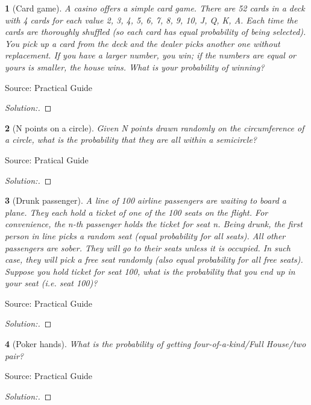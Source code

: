 \documentclass[10pt]{report}
\newtheorem{exe}{}[chapter]
\newenvironment{sol}{\begin{proof}[Solution:]}{\end{proof}}
\begin{document}
\begin{exe}[Card game]
A casino offers a simple card game. There are 52 cards in a deck with 4 cards for each
value 2, 3, 4, 5, 6, 7, 8, 9, 10, J, Q, K, A. Each time the cards are thoroughly shuffled
(so each card has equal probability of being selected). You pick up a card from the deck
and the dealer picks another one without replacement. If you have a larger number, you
win; if the numbers are equal or yours is smaller, the house wins. What is your probability of winning? 
\end{exe}
\begin{teacher}
Source: Practical Guide
\begin{sol}
\end{sol}
\end{teacher}

\begin{exe}[N points on a circle]
Given N points drawn randomly on the circumference of a circle, what is the probability that they are all within a semicircle?
\end{exe}
\begin{teacher}
Source: Pratical Guide
\begin{sol}
\end{sol}
\end{teacher}

\begin{exe}[Drunk passenger]
A line of 100 airline passengers are waiting to board a plane. They each hold a ticket of one of the 100 seats on the flight. For convenience, the n-th passenger holds the ticket for seat n. Being drunk, the first person in line picks a random seat (equal probability for all seats). All other passengers are sober. They will go to their seats unless it is occupied. In such case, they will pick a free seat randomly (also equal probability for all free seats). Suppose you hold ticket for seat 100, what is the probability that you end up in your seat (i.e. seat 100)?
\end{exe}
\begin{teacher}
Source: Practical Guide
\begin{sol}
\end{sol}
\end{teacher}

\begin{exe}[Poker hands]
What is the probability of getting four-of-a-kind/Full House/two pair?
\end{exe}
\begin{teacher}
Source: Practical Guide
\begin{sol}
\end{sol}
\end{teacher}
\end{document}
